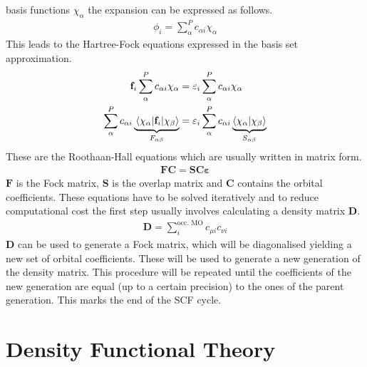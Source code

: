 basis functions $\chi_\alpha$ the expansion can be expressed as follows.
%
\begin{align}
    \phi_i=\sum_\alpha^Pc_{\alpha i}\chi_\alpha
\end{align}
%
This leads to the Hartree-Fock equations expressed in the basis set
approximation.
%
\begin{align}
    \begin{aligned}
        \mathbf{f}_i\sum_\alpha^Pc_{\alpha i}\chi_\alpha&=\varepsilon_i\sum_\alpha^Pc_{\alpha i}\chi_\alpha \\
        \sum_\alpha^Pc_{\alpha i}\underbrace{\mel{\chi_\alpha}{\mathbf{f}_i}{\chi_\beta}}_{F_{\alpha\beta}}&=\varepsilon_i\sum_\alpha^Pc_{\alpha i}\underbrace{\braket{\chi_\alpha}{\chi_\beta}}_{S_{\alpha\beta}}
    \end{aligned}
\end{align}
%
These are the Roothaan-Hall equations which are usually written in matrix form.
%
\begin{align}
    \mathbf{FC}=\mathbf{SC\varepsilon}
\end{align}
%
$\mathbf{F}$ is the Fock matrix, $\mathbf{S}$ is the overlap matrix and
$\mathbf{C}$ contains the orbital coefficients. These equations have to be
solved iteratively and to reduce computational cost the first step usually
involves calculating a density matrix $\mathbf{D}$.
%
\begin{align}
    \mathbf{D}=\sum_{i}^\text{occ. MO} c_{\mu i}c_{\nu i}
\end{align}
%
$\mathbf{D}$ can be used to generate a Fock matrix, which will be diagonalised
yielding a new set of orbital coefficients. These will be used to generate a
new generation of the density matrix. This procedure will be repeated until
the coefficients of the new generation are equal (up to a certain precision)
to the ones of the parent generation. This marks the end of the \ac{SCF} cycle.

\section{Density Functional Theory}
\label{sec:dft}


